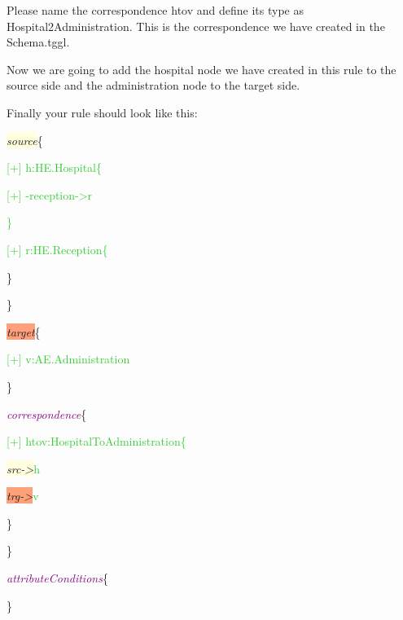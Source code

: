\clearpage

Please name the correspondence \textsf{htov} and define its type as \textsf{Hospital2Administration}. This is the correspondence we have created in the Schema.tggl. 

Now we are going to add the hospital node we have created in this rule to the source side and the administration node to the target side.\newline

Finally your rule should look like this: \newline

{
	
	\hspace{0.5cm}\colorbox{LightYellow}{\textit{source}}\{ 
	
	\hspace{1cm}\textcolor{LimeGreen}{[+] h:HE.Hospital\{}
	
	\hspace{1.5cm}\textcolor{LimeGreen}{[+] -reception->r}
	
	\hspace{1cm}\textcolor{LimeGreen}{\}}
	
	\hspace{1cm}\textcolor{LimeGreen}{[+] r:HE.Reception\{}
	
	\hspace{1cm}\}
	
	\hspace{0.5cm}\}
	
	\hspace{0.5cm}\colorbox{LightSalmon}{\textit{target}}\{
	
	\hspace{1cm}\textcolor{LimeGreen}{[+] v:AE.Administration}
	
	\hspace{0.5cm}\}
	
	\hspace{0.5cm}\textcolor{Purple}{\textit{correspondence}}\{
	
	\hspace{1cm}\textcolor{LimeGreen}{[+] htov:HospitalToAdministration\{}
	
	\hspace{1.5cm}\colorbox{LightYellow}{\textit{src->}}\textcolor{LimeGreen}{h}
	
	\hspace{1.5cm}\colorbox{LightSalmon}{\textit{trg->}}\textcolor{LimeGreen}{v}
	
	\hspace{1cm}\}
	
	\hspace{0.5cm}\}
	
	\hspace{0.5cm}\textcolor{Purple}{\textit{attributeConditions}}\{
	
	\hspace{0.5cm}\}\newline
	
}



